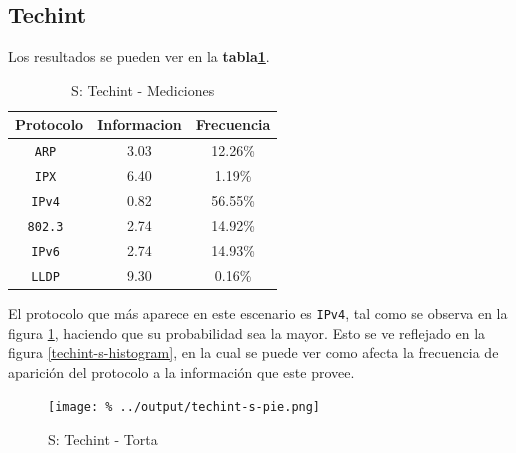 \documentclass[final,inline,a4paper,narroweqnarray]{ieee}
\let\Oldsubsection\subsection
\renewcommand{\subsection}{\FloatBarrier\Oldsubsection}
\begin{document}
    \subsection{Techint}

    Los resultados se pueden ver en la
    \textbf{tabla\ref{techint-s-table}}.

    \begin{table}[ht]\begin{center}
      \begin{tabular}{|c|c|c|}
      \hline
      \textbf{Protocolo} & \textbf{Informacion} & \textbf{Frecuencia} \\ \hline
      \texttt{ARP       }& 3.03        & 12.26\%    \\ \hline
      \texttt{IPX       }& 6.40        & 1.19\%     \\ \hline
      \texttt{IPv4      }& 0.82        & 56.55\%    \\ \hline
      \texttt{802.3     }& 2.74        & 14.92\%    \\ \hline
      \texttt{IPv6      }& 2.74        & 14.93\%    \\ \hline
      \texttt{LLDP      }& 9.30        & 0.16\%     \\ \hline
      \end{tabular}
      \caption{S: Techint - Mediciones}
      \label{techint-s-table}
    \end{center}\end{table}

    El protocolo que más aparece en este escenario es \texttt{IPv4},
    tal como se observa en la figura \ref{techint-s-pie}, haciendo que
    su probabilidad sea la mayor. Esto se ve reflejado en la figura
    \ref{techint-s-histogram}, en la cual se puede ver como afecta la
    frecuencia de aparición del protocolo a la información que este
    provee.


    \begin{figure}[ht]\begin{center}
      \texttt{[image: \%
      ../output/techint-s-pie.png]}
      \vspace{-3em}
      \caption{S: Techint - Torta}
      \label{techint-s-pie}
    \end{center}\end{figure}
\end{document}
